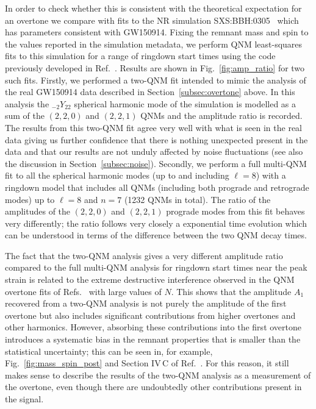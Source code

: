 In order to check whether this is consistent with the theoretical expectation for an overtone we compare with fits to the NR simulation SXS:BBH:0305~\cite{Lovelace:2016uwp} which has parameters consistent with GW150914.
Fixing the remnant mass and spin to the values reported in the simulation metadata, we perform QNM least-squares fits to this simulation for a range of ringdown start times using the code previously developed in Ref.~\cite{Finch:2021iip}.
Results are shown in Fig.~\ref{fig:amp_ratio} for two such fits. 
Firstly, we performed a two-QNM fit intended to mimic the analysis of the real GW150914 data described in Section~\ref{subsec:overtone} above. 
In this analysis the ${}_{-2}Y_{22}$ spherical harmonic mode of the simulation is modelled as a sum of the $(2,2,0)$ and $(2,2,1)$ QNMs and the amplitude ratio is recorded. 
The results from this two-QNM fit agree very well with what is seen in the real data giving us further confidence that there is nothing unexpected present in the data and that our results are not unduly affected by noise fluctuations (see also the discussion in Section~\ref{subsec:noise}). 
Secondly, we perform a full multi-QNM fit to all the spherical harmonic modes (up to and including $\ell = 8$) with a ringdown model that includes all QNMs (including both prograde and retrograde modes) up to $\ell = 8$ and $n = 7$ (1232 QNMs in total).
The ratio of the amplitudes of the $(2,2,0)$ and $(2,2,1)$ prograde modes from this fit behaves very differently; the ratio follows very closely a exponential time evolution which can be understood in terms of the difference between the two QNM decay times.

The fact that the two-QNM analysis gives a very different amplitude ratio compared to the full multi-QNM analysis for ringdown start times near the peak strain is related to the extreme destructive interference observed in the QNM overtone fits of Refs.~\cite{Giesler:2019uxc, Bhagwat:2019dtm, Ota:2019bzl, Cook:2020otn, JimenezForteza:2020cve, Dhani:2020nik, Finch:2021iip, Forteza:2021wfq, Dhani:2021vac, MaganaZertuche:2021syq} with large values of $N$.
This shows that the amplitude $A_1$ recovered from a two-QNM analysis is not purely the amplitude of the first overtone but also includes significant contributions from higher overtones and other harmonics. 
However, absorbing these contributions into the first overtone introduces a systematic bias in the remnant properties that is smaller than the statistical uncertainty; this can be seen in, for example, Fig.~\ref{fig:mass_spin_post} and Section IV\,C of Ref.~\cite{Giesler:2019uxc}. 
For this reason, it still makes sense to describe the results of the two-QNM analysis as a measurement of the overtone, even though there are undoubtedly other contributions present in the signal.


